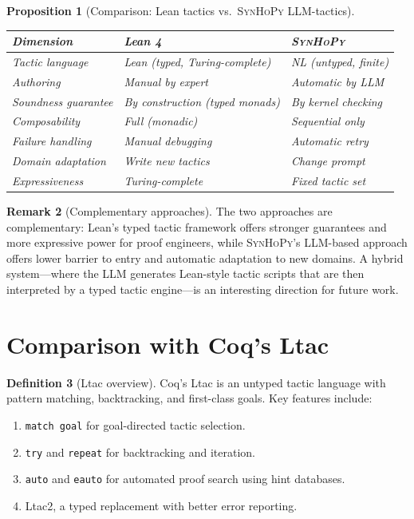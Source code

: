 \documentclass[11pt,a4paper]{report}
\theoremstyle{definition}
\newtheorem{definition}{Definition}[chapter]
\newtheorem{remark}[definition]{Remark}
\theoremstyle{plain}
\newtheorem{proposition}[definition]{Proposition}
\newcommand{\synhopy}{\textsc{SynHoPy}}
\begin{document}
\begin{proposition}[Comparison: Lean tactics vs.\ \synhopy{} LLM-tactics]
\label{prop:lean-comparison}
\begin{center}
\begin{tabular}{lll}
\toprule
\textbf{Dimension} & \textbf{Lean 4} & \textbf{\synhopy{}} \\
\midrule
Tactic language     & Lean (typed, Turing-complete) & NL (untyped, finite) \\
Authoring           & Manual by expert               & Automatic by LLM \\
Soundness guarantee & By construction (typed monads) & By kernel checking \\
Composability       & Full (monadic)                 & Sequential only \\
Failure handling    & Manual debugging               & Automatic retry \\
Domain adaptation   & Write new tactics              & Change prompt \\
Expressiveness      & Turing-complete                & Fixed tactic set \\
\bottomrule
\end{tabular}
\end{center}
\end{proposition}

\begin{remark}[Complementary approaches]
The two approaches are complementary: Lean's typed tactic framework offers
stronger guarantees and more expressive power for proof engineers, while
\synhopy{}'s LLM-based approach offers lower barrier to entry and automatic
adaptation to new domains.  A hybrid system---where the LLM generates Lean-style
tactic scripts that are then interpreted by a typed tactic engine---is an
interesting direction for future work.
\end{remark}


\section{Comparison with Coq's Ltac}

\begin{definition}[Ltac overview]
Coq's Ltac is an untyped tactic language with pattern matching, backtracking,
and first-class goals.  Key features include:
\begin{enumerate}
  \item \lstinline[style=fstar]|match goal| for goal-directed tactic selection.
  \item \lstinline[style=fstar]|try| and \lstinline[style=fstar]|repeat| for
    backtracking and iteration.
  \item \lstinline[style=fstar]|auto| and \lstinline[style=fstar]|eauto| for
    automated proof search using hint databases.
  \item Ltac2, a typed replacement with better error reporting.
\end{enumerate}
\end{definition}
\end{document}
